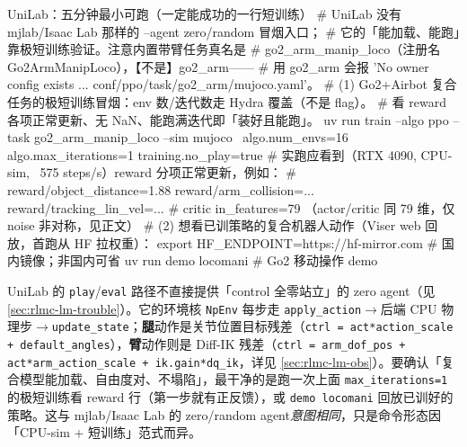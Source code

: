 \begin{codebox}[bash]{UniLab：五分钟最小可跑（一定能成功的一行短训练）}
# UniLab 没有 mjlab/Isaac Lab 那样的 --agent zero/random 冒烟入口；
# 它的「能加载、能跑」靠极短训练验证。注意内置带臂任务真名是
# go2_arm_manip_loco（注册名 Go2ArmManipLoco），【不是】go2_arm——
# 用 go2_arm 会报 'No owner config exists ... conf/ppo/task/go2_arm/mujoco.yaml'。
# (1) Go2+Airbot 复合任务的极短训练冒烟：env 数/迭代数走 Hydra 覆盖（不是 flag）。
#     看 reward 各项正常更新、无 NaN、能跑满迭代即「装好且能跑」。
uv run train --algo ppo --task go2_arm_manip_loco --sim mujoco \
    algo.num_envs=16 algo.max_iterations=1 training.no_play=true
# 实跑应看到（RTX 4090, CPU-sim, ~575 steps/s）reward 分项正常更新，例如：
#   reward/object_distance=1.88   reward/arm_collision=...   reward/tracking_lin_vel=...
#   critic in_features=79         （actor/critic 同 79 维，仅 noise 非对称，见正文）
# (2) 想看已训策略的复合机器人动作（Viser web 回放，首跑从 HF 拉权重）：
export HF_ENDPOINT=https://hf-mirror.com         # 国内镜像；非国内可省
uv run demo locomani                             # Go2 移动操作 demo
\end{codebox}

\begin{note}
UniLab 的 \verb|play|/\verb|eval| 路径不直接提供「control 全零站立」的 zero agent（见 \cref{sec:rlmc-lm-trouble}）。它的环境核 \verb|NpEnv| 每步走 \verb|apply_action|$\to$后端 CPU 物理步$\to$\verb|update_state|；\textbf{腿}动作是关节位置目标残差（\verb|ctrl = act*action_scale + default_angles|），\textbf{臂}动作则是 Diff-IK 残差（\verb|ctrl = arm_dof_pos + act*arm_action_scale + ik.gain*dq_ik|，详见 \cref{sec:rlmc-lm-obs}）。要确认「复合模型能加载、自由度对、不塌陷」，最干净的是跑一次上面 \verb|max_iterations=1| 的极短训练看 reward 行（第一步就有正反馈），或 \verb|demo locomani| 回放已训好的策略。这与 mjlab/Isaac Lab 的 zero/random agent\emph{意图相同}，只是命令形态因「CPU-sim + 短训练」范式而异。
\end{note}

